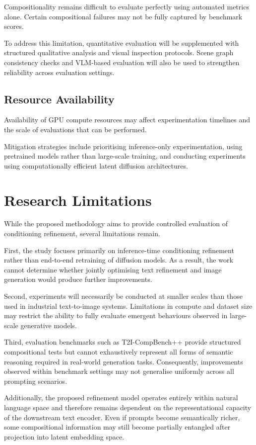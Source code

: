 \documentclass[a4paper,twoside,12pt]{report}
\begin{document}
Compositionality remains difficult to evaluate perfectly using automated metrics alone. Certain compositional failures may not be fully captured by benchmark scores.

To address this limitation, quantitative evaluation will be supplemented with structured qualitative analysis and visual inspection protocols. Scene graph consistency checks and VLM-based evaluation will also be used to strengthen reliability across evaluation settings.

\subsection{Resource Availability}

Availability of GPU compute resources may affect experimentation timelines and the scale of evaluations that can be performed.

Mitigation strategies include prioritising inference-only experimentation, using pretrained models rather than large-scale training, and conducting experiments using computationally efficient latent diffusion architectures.

\section{Research Limitations}

While the proposed methodology aims to provide controlled evaluation of conditioning refinement, several limitations remain.

First, the study focuses primarily on inference-time conditioning refinement rather than end-to-end retraining of diffusion models. As a result, the work cannot determine whether jointly optimising text refinement and image generation would produce further improvements.

Second, experiments will necessarily be conducted at smaller scales than those used in industrial text-to-image systems. Limitations in compute and dataset size may restrict the ability to fully evaluate emergent behaviours observed in large-scale generative models.

Third, evaluation benchmarks such as T2I-CompBench++ provide structured compositional tests but cannot exhaustively represent all forms of semantic reasoning required in real-world generation tasks. Consequently, improvements observed within benchmark settings may not generalise uniformly across all prompting scenarios.

Additionally, the proposed refinement model operates entirely within natural language space and therefore remains dependent on the representational capacity of the downstream text encoder. Even if prompts become semantically richer, some compositional information may still become partially entangled after projection into latent embedding space.
\end{document}
